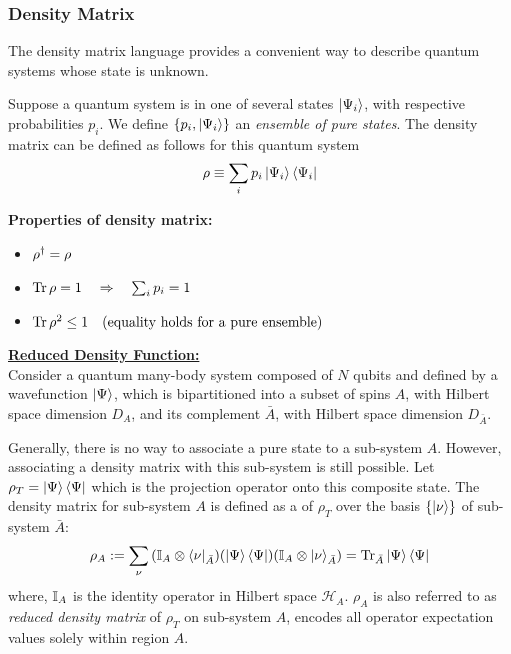 \documentclass[11pt, oneside, listof=totoc]{scrbook}
\renewcommand{\H}{\mathcal{H}}
\begin{document}
\subsubsection{Density Matrix}

The density matrix language provides a convenient way to describe quantum systems whose state is unknown.
\begin{definition}
    Suppose a quantum system is in one of several states \(\ket{\Psi_i}\), with respective probabilities \(p_i\). We define \(\qty{p_i, \ket{\Psi_i}}\) an \emph{ensemble of pure states}. The density matrix can be defined as follows for this quantum system
    \[
        \rho \equiv \sum_{i} p_i \ket{\Psi_i} \bra{\Psi_i}
    \]
\end{definition}
{\bfseries Properties of density matrix:}
\begin{itemize}[noitemsep]
    \item \(\rho^\dagger = \rho\)
    \item \(\Tr\rho = 1 \quad \Rightarrow \quad \sum_{i} p_i = 1\)
    \item \(\Tr \rho^2 \le 1 \quad (\text{equality holds for a pure ensemble})\)
\end{itemize}
{\bfseries \uline{Reduced Density Function:}}\\
Consider a quantum many-body system composed of \(N\) qubits and defined by a wavefunction \(\ket{\Psi}\), which is bipartitioned into a subset of spins \(A\), with Hilbert space dimension \(D_{A}\), and its complement \(\bar{A}\), with Hilbert space dimension \(D_{\bar{A}}\).

Generally, there is no way to associate a pure state to a sub-system $A$. However, associating a density matrix with this sub-system is still possible. Let \(\rho_{T} = \ket{\Psi} \bra{\Psi}\) which is the projection operator onto this composite state. The density matrix for sub-system \(A\) is defined as a  of \(\rho_T\) over the basis \(\qty{\ket{\nu}}\) of sub-system \(\bar{A}\):
\begin{equation}
    \rho_A := \sum_{\nu} \qty(\mathbb{I}_{A} \otimes \bra{\nu}_{\bar{A}}) \qty(\ket{\Psi} \bra{\Psi}) \qty(\mathbb{I}_{A} \otimes \ket{\nu}_{\bar{A}}) = \Tr_{\bar{A}} \ket{\Psi} \bra{\Psi}
\end{equation}
where, \(\mathbb{I}_{A}\) is the identity operator in Hilbert space \(\H_A\). \(\rho_A\) is also referred to as \emph{reduced density matrix} of \(\rho_T\) on sub-system \(A\), encodes all operator expectation values solely within region $A$.
\end{document}
